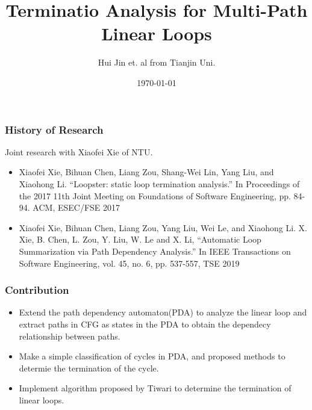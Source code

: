 \documentclass[11pt]{beamer}
\title{Terminatio Analysis for Multi-Path Linear Loops}
\date{\today}
\author{Hui Jin et. al from Tianjin Uni.}
\begin{document}
\maketitle

\begin{frame}\frametitle{History of Research}
Joint research with Xiaofei Xie of NTU.

\begin{itemize}

\item Xiaofei Xie, Bihuan Chen, Liang Zou, Shang-Wei Lin, Yang Liu, and Xiaohong Li. “Loopster: static loop termination analysis.” In Proceedings of the 2017 11th Joint Meeting on Foundations of Software Engineering, pp. 84-94. ACM, ESEC/FSE 2017
\item Xiaofei Xie, Bihuan Chen, Liang Zou, Yang Liu, Wei Le, and Xiaohong Li. X. Xie, B. Chen, L. Zou, Y. Liu, W. Le and X. Li, “Automatic Loop Summarization via Path Dependency Analysis.” In IEEE Transactions on Software Engineering, vol. 45, no. 6, pp. 537-557, TSE 2019
\end{itemize}
\end{frame}
\begin{frame}\frametitle{Contribution}
\begin{itemize}
\item Extend the path dependency automaton(PDA) to analyze the linear loop and extract paths in CFG as states in the PDA to obtain the dependecy relationship between paths.

\item Make a simple classification of cycles in PDA, and proposed methods to determie the termination of the cycle.

\item Implement algorithm proposed by Tiwari to determine the termination of linear loops. 
\end{itemize}
\end{frame}
\end{document}
